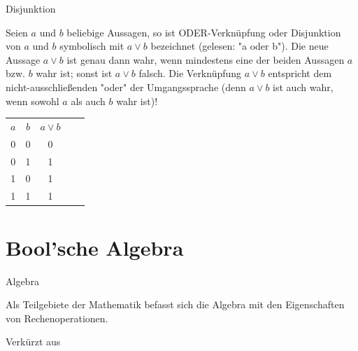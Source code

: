 \documentclass[12pt%
,aspectratio=169%
]{beamer}
\begin{document}
\begin{frame}{Disjunktion}
\begin{definition}[Disjunktion]
Seien $a$ und $b$ beliebige Aussagen, so ist ODER-Verknüpfung oder Disjunktion von $a$ und $b$ symbolisch mit $a \lor b$ bezeichnet (gelesen: "a oder b"). Die neue Aussage $a \lor b$ ist genau dann wahr, wenn mindestens eine der beiden Aussagen $a$ bzw. $b$ wahr ist; sonst ist $a \lor b$ falsch. Die Verknüpfung $a \lor b$ entspricht dem nicht-ausschließenden "oder" der Umgangssprache (denn $a \lor b$ ist auch wahr, wenn sowohl $a$ als auch $b$ wahr ist)!
\begin{center}
\begin{table}[]
\begin{tabular}{|c|c|c|ll}
\cline{1-3}
$a$ & $b$ & $a \lor b$ &  &  \\ \cline{1-3}
0 & 0 & 0 &  &  \\ \cline{1-3}
0 & 1 & 1 &  &  \\ \cline{1-3}
1 & 0 & 1 &  &  \\ \cline{1-3}
1 & 1 & 1 &  &  \\ \cline{1-3}
\end{tabular}
\end{table}
\end{center}
\end{definition}

\end{frame}

\section{Bool'sche Algebra}

\begin{frame}{Algebra}
\begin{definition}[Algebra]
Als Teilgebiete der Mathematik befasst sich die Algebra mit den Eigenschaften von Rechenoperationen.
\end{definition} 
Verkürzt aus \cite{bewersdorff2007algebra}
\end{frame}
\end{document}
